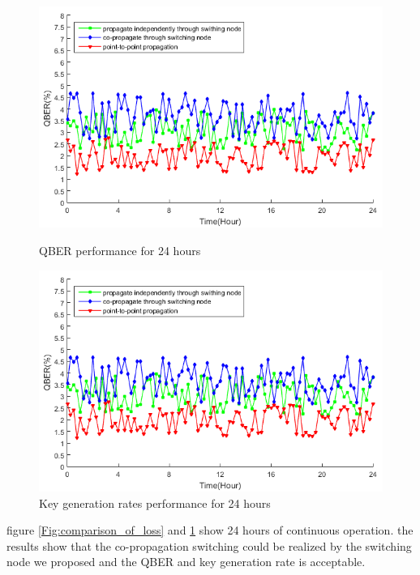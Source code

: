 \documentclass[letterpaper,10pt]{article}
\begin{document}
\begin{figure}[!htb]
   \begin{minipage}{0.48\textwidth}
     \centering
     \includegraphics[width=.9\linewidth]{qber_experiment}
     \caption{QBER performance for 24 hours} \label{Fig:comparison_of_loss}
   \end{minipage}\hfill
   \begin{minipage}{0.48\textwidth}
     \centering
     \includegraphics[width=.9\linewidth]{qber_experiment}
     \caption{Key generation rates performance for 24 hours} \label{Fig:comparison_of_rate}
   \end{minipage}
\end{figure}
figure \ref{Fig:comparison_of_loss} and \ref{Fig:comparison_of_rate} show 24 hours of continuous operation. the results show that the co-propagation switching could be realized by the switching node we proposed and the QBER and key generation rate is acceptable. 
\end{document}
